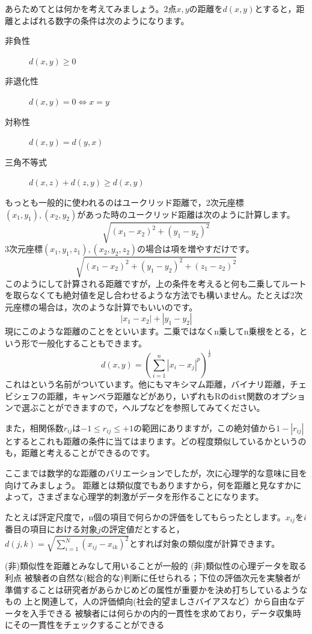 \documentclass{ltjsbook}
\begin{document}
あらためてとは何かを考えてみましょう。2点$x,y$の距離を$d(x,y)$とすると，距離とよばれる数字の条件は次のようになります。
\begin{description}
    \item[非負性] $d(x,y)\ge 0$
    \item[非退化性] $d(x,y)=0 \Leftrightarrow x=y$
    \item[対称性] $d(x,y)=d(y,x)$
    \item[三角不等式] $d(x,z) + d(z,y) \ge d(x,y)$
\end{description}
もっとも一般的に使われるのはユークリッド距離で，2次元座標$(x_1,y_1),(x_2,y_2)$があった時のユークリッド距離は次のように計算します。
\[ \sqrt{(x_1-x_2)^2+(y_1-y_2)^2} \]
3次元座標$(x_1,y_1,z_1),(x_2,y_2,z_2)$の場合は項を増やすだけです。
\[ \sqrt{(x_1-x_2)^2+(y_1-y_2)^2+(z_1-z_2)^2} \]
このようにして計算される距離ですが，上の条件を考えると何も二乗してルートを取らなくても絶対値を足し合わせるような方法でも構いません。たとえば2次元座標の場合は，次のような計算でもいいのです。
\[ |x_1-x_2|+|y_1-y_2| \]
現にこのような距離のことをといいます。二乗ではなくn乗してn乗根をとる，という形で一般化することもできます。
\[ d(x,y) = \left( \sum_{i=1}^n |x_i - x_j|^p\right)^{\frac{1}{p}} \]
これはという名前がついています。他にもマキシマム距離，バイナリ距離，チェビシェフの距離，キャンベラ距離などがあり，いずれもRの\texttt{dist}関数のオプションで選ぶことができますので，ヘルプなどを参照してみてください。

また，相関係数$r_{ij}$は$-1 \le r_{ij} \le +1$の範囲にありますが，この絶対値から$1-|r_{ij}|$とするとこれも距離の条件に当てはまります。どの程度類似しているかというのも，距離と考えることができるのです。

ここまでは数学的な距離のバリエーションでしたが，次に心理学的な意味に目を向けてみましょう。
距離とは類似度でもありますから，何を距離と見なすかによって，さまざまな心理学的刺激がデータを形作ることになります。

たとえば評定尺度で，n個の項目で何らかの評価をしてもらったとします。$x_{ij}$を$i$番目の項目における対象$j$の評定値だとすると，
$d(j,k) = \sqrt{\sum_{i=1}^N (x_{ij}-x_{ik})^2 }$とすれば対象の類似度が計算できます。


(非)類似性を距離とみなして用いることが一般的
(非)類似性の心理データを取る利点
被験者の自然な(総合的な)判断に任せられる；下位の評価次元を実験者が準備することは研究者があらかじめどの属性が重要かを決め打ちしているようなもの
上と関連して，人の評価傾向(社会的望ましさバイアスなど）から自由なデータを入手できる
被験者には何らかの内的一貫性を求めており，データ収集時にその一貫性をチェックすることができる
\end{document}
